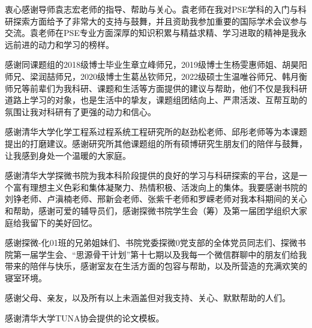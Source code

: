 
\begin{acknowledgements}
  衷心感谢导师袁志宏老师的指导、帮助与关心。袁老师在我对PSE学科的入门与科研探索方面给予了非常大的支持与鼓舞，并且资助我参加重要的国际学术会议参与交流。袁老师在PSE专业方面深厚的知识积累与精益求精、学习进取的精神是我永远前进的动力和学习的榜样。

  感谢同课题组的2018级博士毕业生章立峰师兄，2019级博士生杨雯惠师姐、胡昊阳师兄、梁润喆师兄，2020级博士生葛丛钦师兄，2022级硕士生温唯谷师兄、韩月衡师兄等前辈们为我科研、课题和生活等方面提供的建议与帮助，他们不仅是我科研道路上学习的对象，也是生活中的挚友，课题组团结向上、严肃活泼、互帮互助的氛围让我对科研有了更强的动力和信心。

  感谢清华大学化学工程系过程系统工程研究所的赵劲松老师、邱彤老师等为本课题提出的打磨建议。感谢研究所其他课题组的所有硕博研究生朋友们的陪伴与鼓舞，让我感到身处一个温暖的大家庭。

  感谢清华大学探微书院为我本科阶段提供的良好的学习与科研探索的平台，这是一个富有理想主义色彩和集体凝聚力、热情积极、活泼向上的集体。我要感谢书院的刘铮老师、卢滇楠老师、邢新会老师、张紫千老师和罗嵘老师对我本科期间的关心和帮助，感谢可爱的辅导员们，感谢探微书院学生会（筹）及第一届团学组织大家庭给我留下的美好回忆。

  感谢探微-化01班的兄弟姐妹们、书院党委探微0党支部的全体党员同志们、探微书院第一届学生会、“思源骨干计划”第十七期以及我每一个微信群聊中的朋友们给我带来的陪伴与快乐，感谢室友在生活方面的包容与帮助，以及所营造的充满欢笑的寝室环境。

  感谢父母、亲友，以及所有以上未涵盖但对我支持、关心、默默帮助的人们。

  感谢清华大学TUNA协会提供的论文模板。

\end{acknowledgements}
